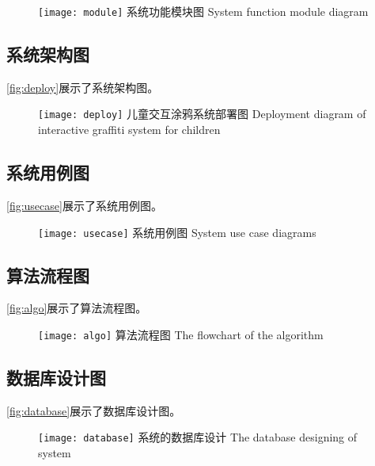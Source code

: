\documentclass[12pt]{zjutthesis}
\begin{document}
\begin{figure}[htp]
  \centering
  \texttt{[image: module]}
  \bicaption
    {系统功能模块图}
    {System function module diagram}
  \label{fig:module}
\end{figure}

\subsection{系统架构图}
\autoref{fig:deploy}展示了系统架构图。

\begin{figure}[htp]
  \centering
  \texttt{[image: deploy]}
  \bicaption
    {儿童交互涂鸦系统部署图}
    {Deployment diagram of interactive graffiti system for children}
  \label{fig:deploy}
\end{figure}

\subsection{系统用例图}
\autoref{fig:usecase}展示了系统用例图。

\begin{figure}[!htp]
  \centering
  \texttt{[image: usecase]}
  \bicaption
    {系统用例图}
    {System use case diagrams}
  \label{fig:usecase}
\end{figure}

\subsection{算法流程图}
\autoref{fig:algo}展示了算法流程图。

\begin{figure}[!htp]
  \centering
  \texttt{[image: algo]}
  \bicaption
    {算法流程图}
    {The flowchart of the algorithm}
  \label{fig:algo}
\end{figure}

\subsection{数据库设计图}
\autoref{fig:database}展示了数据库设计图。

\begin{figure}[!htp]
  \centering
  \texttt{[image: database]}
  \bicaption
    {系统的数据库设计}
    {The database designing of system}
  \label{fig:database}
\end{figure}
\end{document}
